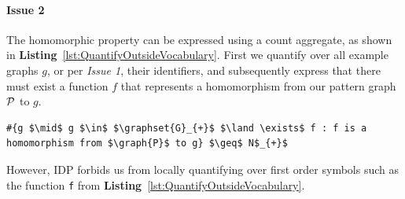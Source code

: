 \paragraph{Issue 2}
The homomorphic property can be expressed using a count aggregate, as shown in \textbf{Listing}~\ref{lst:QuantifyOutsideVocabulary}.
First we quantify over all example graphs $g$, or per \textit{Issue 1}, their identifiers, and subsequently express that there must exist a function $f$ that represents a homomorphism from our pattern graph $\mathcal{P}$ to $g$.
\begin{center}
\begin{minipage}{0.75\linewidth}
\vspace{-1em}
\begin{lstlisting}[style=small,mathescape, caption=Quantifying over functions outside the vocabulary, label=lst:QuantifyOutsideVocabulary]
#{g $\mid$ g $\in$ $\graphset{G}_{+}$ $\land \exists$ f : f is a homomorphism from $\graph{P}$ to g} $\geq$ N$_{+}$
\end{lstlisting}
\vspace{-0.75em}
\end{minipage}
\end{center}
However, IDP forbids us from locally quantifying over first order symbols such as the function  \lstinline{f} from \textbf{Listing}~\ref{lst:QuantifyOutsideVocabulary}.
